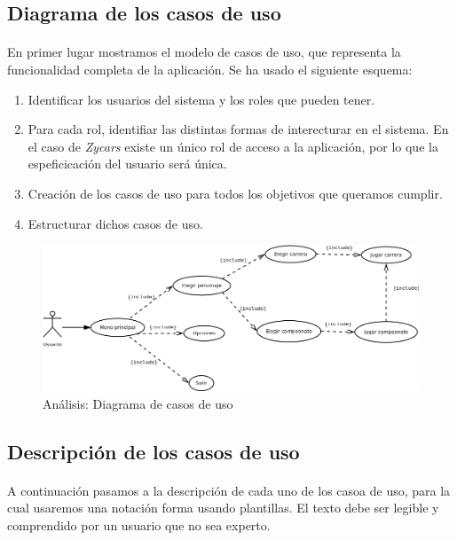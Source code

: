 \subsection{Diagrama de los casos de uso}

\paragraph{}
En primer lugar mostramos el modelo de casos de uso, que representa la funcionalidad completa de la aplicación. Se ha usado el 
siguiente esquema:

\begin{enumerate}
    \item Identificar los usuarios del sistema y los roles que pueden tener.
    \item Para cada rol, identifiar las distintas formas de interecturar en el sistema. En el caso de \emph{Zycars} existe
    un único rol de acceso a la aplicación, por lo que la espeficicación del usuario será única.
    \item Creación de los casos de uso para todos los objetivos que queramos cumplir.
    \item Estructurar dichos casos de uso.
\end{enumerate}

\begin{figure}[H]
  \label{diagrama_casos_uso}
  \begin{center}
    \includegraphics[scale=0.5]{imagenes/diagrama_casos.png}
  \end{center}
  \caption{Análisis: Diagrama de casos de uso}
\end{figure}

\subsection{Descripción de los casos de uso}

\paragraph{}
A continuación pasamos a la descripción de cada uno de los casoa de uso, para la cual usaremos una notación forma usando plantillas.
El texto debe ser legible y comprendido por un usuario que no sea experto.

